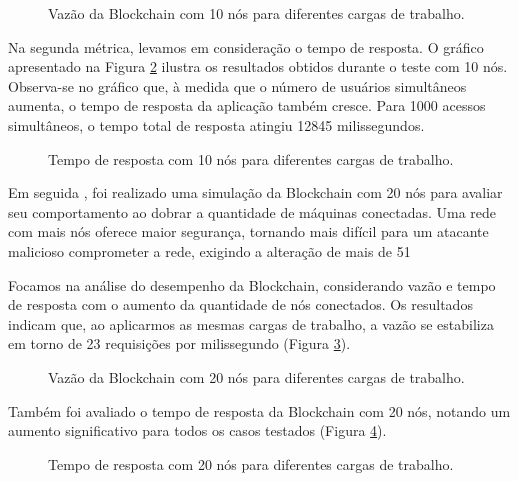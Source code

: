          \begin{figure}[H]
            \centering
            \caption{Vazão da Blockchain com 10 nós para diferentes cargas de trabalho.}
            \label{graf_vazao10}
        \end{figure}

        

        Na segunda métrica, levamos em consideração o tempo de resposta. O gráfico apresentado na Figura \ref{graf_tp_resposta} ilustra os resultados obtidos durante o teste com 10 nós. Observa-se no gráfico que, à medida que o número de usuários simultâneos aumenta, o tempo de resposta da aplicação também cresce. Para 1000 acessos simultâneos, o tempo total de resposta atingiu 12845 milissegundos.
        \begin{figure}[H]
            \centering
            \caption{Tempo de resposta com 10 nós para diferentes cargas de trabalho.}
            \label{graf_tp_resposta}
        \end{figure}

        Em seguida , foi realizado uma simulação da Blockchain com 20 nós para avaliar seu comportamento ao dobrar a quantidade de máquinas conectadas. Uma rede com mais nós oferece maior segurança, tornando mais difícil para um atacante malicioso comprometer a rede, exigindo a alteração de mais de 51%

        Focamos na análise do desempenho da Blockchain, considerando vazão e tempo de resposta com o aumento da quantidade de nós conectados. Os resultados indicam que, ao aplicarmos as mesmas cargas de trabalho, a vazão se estabiliza em torno de 23 requisições por milissegundo (Figura \ref{graf_vazao_20}). 
        \begin{figure}[H]
            \centering
            \caption{Vazão da Blockchain com 20 nós para diferentes cargas de trabalho.}
            \label{graf_vazao_20}
        \end{figure}

        
        Também foi avaliado o tempo de resposta da Blockchain com 20 nós, notando um aumento significativo para todos os casos testados (Figura \ref{graf_tp_resposta_20}).
        \begin{figure}[H]
            \centering
            \caption{Tempo de resposta com 20 nós para diferentes cargas de trabalho.}
            \label{graf_tp_resposta_20}
        \end{figure}

